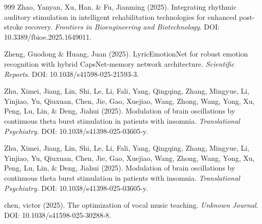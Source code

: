 \documentclass[9pt,onecolumn]{article}
\begin{document}
\begin{thebibliography}{999}
Zhao, Yanyan, Xu, Han, \& Fu, Jianming (2025). Integrating rhythmic auditory stimulation in intelligent rehabilitation technologies for enhanced post-stroke recovery. \textit{Frontiers in Bioengineering and Biotechnology}. DOI: 10.3389/fbioe.2025.1649011.

Zheng, Guodong \& Huang, Juan (2025). LyricEmotionNet for robust emotion recognition with hybrid CapsNet-memory network architecture. \textit{Scientific Reports}. DOI: 10.1038/s41598-025-21593-3.

Zhu, Ximei, Jiang, Lin, Shi, Le, Li, Fali, Yang, Qingqing, Zhang, Mingyue, Li, Yinjiao, Yu, Qiuxuan, Chen, Jie, Gao, Xuejiao, Wang, Zhong, Wang, Yong, Xu, Peng, Lu, Lin, \& Deng, Jiahui (2025). Modulation of brain oscillations by continuous theta burst stimulation in patients with insomnia. \textit{Translational Psychiatry}. DOI: 10.1038/s41398-025-03605-y.

Zhu, Ximei, Jiang, Lin, Shi, Le, Li, Fali, Yang, Qingqing, Zhang, Mingyue, Li, Yinjiao, Yu, Qiuxuan, Chen, Jie, Gao, Xuejiao, Wang, Zhong, Wang, Yong, Xu, Peng, Lu, Lin, \& Deng, Jiahui (2025). Modulation of brain oscillations by continuous theta burst stimulation in patients with insomnia. \textit{Translational Psychiatry}. DOI: 10.1038/s41398-025-03605-y.

chen, victor (2025). The optimization of vocal music teaching. \textit{Unknown Journal}. DOI: 10.1038/s41598-025-30288-8.

\end{thebibliography}

\end{document}
